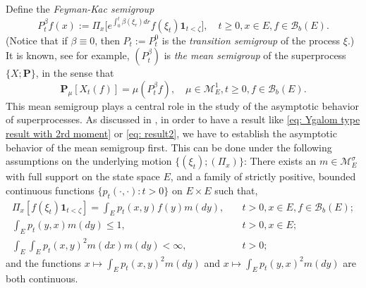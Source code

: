 \documentclass[12pt, a4paper]{amsart}
\theoremstyle{definition}
\newenvironment{asp}[1]{\renewcommand\theinnerasp{#1}\innerasp}{\endinnerasp}
\numberwithin{equation}{section}
\begin{document}
	Define the \emph{Feyman-Kac semigroup}
\[
	P^\beta_tf(x)
	:=
	\Pi_x \big[e^{\int_0^{t} \beta(\xi_r)dr} f(\xi_t)\mathbf 1_{t<\zeta}\big],
	\quad t\geq 0, x\in E, f\in \mathscr B_b(E).
\]
	(Notice that if $\beta \equiv 0$,
then $P_t:= P^0_t$ is the \emph{transition semigroup} of the process $\xi$.)
	It is known, see \cite[Proposition 2.27]{Li2011Measure-valued} for example, $(P^\beta_t)$ is \emph{the mean semigroup} of the superprocess $\{X; \mathbf P\}$, in the sense that
	\[ \label{eq: Ygalom type result without 2rd moment}
	\mathbf P_\mu [X_t(f)]
	= \mu(P^\beta_t f),
	\quad \mu \in \mathcal M^1_E, 
	t \geq 0,f \in \mathscr B_b(E).
	\]
	This mean semigroup plays a central role in the study of the asymptotic behavior of superprocesses.
	As discussed in \cite{EvansPerkins1990Measure-valued}, in order to have a result like \eqref{eq: Ygalom type result with 2rd moment} 
	or \eqref{eq: result2},
	we have to establish the asymptotic behavior of the mean semigroup first.
	This can be done under the following assumptions on the underlying motion 
	$\{(\xi_t); (\Pi_x)\}$:
\begin{asp}{1}
\label{asp: 1}
	There exists an $m \in \mathcal M_E^\sigma$ with full support on the state space $E$, and a family of strictly positive, bounded continuous functions $\{ p_t(\cdot,\cdot): t > 0 \}$ on $E \times E$ such that,
\[\begin{split}
	\Pi_x[ f(\xi_t)\mathbf 1_{t < \zeta} ]
	= \int_E p_t(x,y) f(y) m(dy),
	&\quad t>0, x \in E,f \in \mathscr B_b(E);
	\\\int_E p_t(y,x)m(dy)
	\leq 1,	
	&\quad t>0,x\in E;
	\\\int_E \int_E p_t(x,y)^2 m(dx) m(dy)
	<\infty,
	&\quad t> 0;
\end{split}\]
	and the functions $x \mapsto \int_E p_t(x,y)^2 m(dy)$
and 
	$x \mapsto \int_E p_t(y,x)^2 m(dy)$ are both continuous.
\end{asp}
\end{document}
